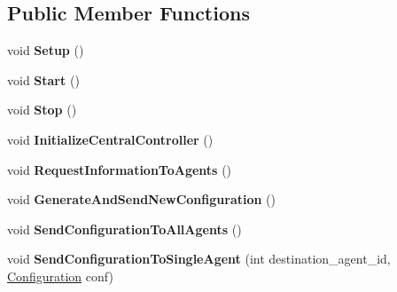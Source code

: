 \subsection*{Public Member Functions}
\begin{DoxyCompactItemize}
\item 
\mbox{\label{classcompcxx__CentralController__26_af502b2d53c56b98819b90701177786b6}} 
void {\bfseries Setup} ()
\item 
\mbox{\label{classcompcxx__CentralController__26_a6e310ea47cfd87befacac15ad20b5ed7}} 
void {\bfseries Start} ()
\item 
\mbox{\label{classcompcxx__CentralController__26_aee7d621f5e9505dbbf90954b5fe5ff20}} 
void {\bfseries Stop} ()
\item 
\mbox{\label{classcompcxx__CentralController__26_ada0b5a8f856377a4f274710d922988c8}} 
void {\bfseries Initialize\+Central\+Controller} ()
\item 
\mbox{\label{classcompcxx__CentralController__26_af394845a8af7930c03120338b4906e87}} 
void {\bfseries Request\+Information\+To\+Agents} ()
\item 
\mbox{\label{classcompcxx__CentralController__26_abfb6f274083e445d3d3e8a8ad6b5b55a}} 
void {\bfseries Generate\+And\+Send\+New\+Configuration} ()
\item 
\mbox{\label{classcompcxx__CentralController__26_af65e589792a448d316d87eaf2eb283b4}} 
void {\bfseries Send\+Configuration\+To\+All\+Agents} ()
\item 
\mbox{\label{classcompcxx__CentralController__26_a0e9b6ebd2c775d98f442b3e50d4d09b1}} 
void {\bfseries Send\+Configuration\+To\+Single\+Agent} (int destination\+\_\+agent\+\_\+id, \hyperlink{structConfiguration}{Configuration} conf)
\item 
\mbox{\label{classcompcxx__CentralController__26_af1257d2a942a1cebad8fff3ea878a35f}} 

\end{DoxyCompactItemize}
